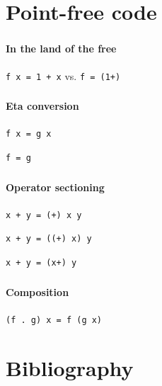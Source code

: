 \documentclass{beamer}
\begin{document}

\section{Point-free code}

\begin{frame}
    \frametitle{\insertsection}
    \framesubtitle{In the land of the free\textellipsis}
    \centerline{\texttt{f x = 1 + x} vs. \texttt{f = (1+)}}
\end{frame}

\begin{frame}
    \frametitle{\insertsection}
    \framesubtitle{Eta conversion}
    \centerline{
        \texttt{f x = g x}
        }
    \centerline{
        \texttt{f = g}
    }
\end{frame}

\begin{frame}
    \frametitle{\insertsection}
    \framesubtitle{Operator sectioning}

    \centerline{
        \texttt{x + y = (+) x y}
    }
    \centerline{
        \texttt{x + y = ((+) x) y}
    }
    \centerline{
        \texttt{x + y = (x+) y}
    }
\end{frame}

\begin{frame}
    \frametitle{\insertsection}
    \framesubtitle{Composition}
    \centerline{
        \texttt{(f . g) x = f (g x)}
    }
\end{frame}

\section{Bibliography}

\begin{frame}
    \frametitle{\insertsection}
    \nocite{*}
    \printbibliography
\end{frame}
\end{document}

